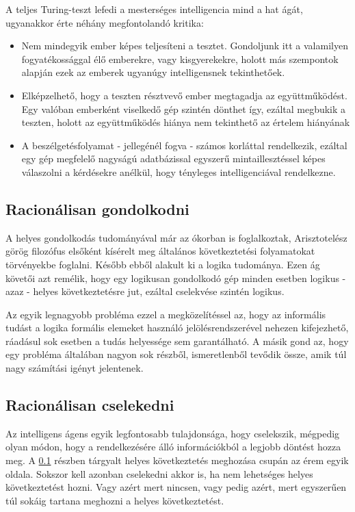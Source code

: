 A teljes Turing-teszt lefedi a mesterséges intelligencia mind a hat ágát, ugyanakkor érte néhány megfontolandó kritika: \cite{bibref:turing}
\begin{itemize}
	\item Nem mindegyik ember képes teljesíteni a tesztet. Gondoljunk itt a valamilyen fogyatékossággal élő emberekre, vagy kisgyerekekre, holott más szempontok alapján ezek az emberek ugyanúgy intelligensnek tekinthetőek.
	\item Elképzelhető, hogy a teszten résztvevő ember megtagadja az együttműködést. Egy valóban emberként viselkedő gép szintén dönthet így, ezáltal megbukik a teszten, holott az együttműködés hiánya nem tekinthető az értelem hiányának
	\item A beszélgetésfolyamat - jellegénél fogva - számos korláttal rendelkezik, ezáltal egy gép megfelelő nagyságú adatbázissal egyszerű mintaillesztéssel képes válaszolni a kérdésekre anélkül, hogy tényleges intelligenciával rendelkezne. 
\end{itemize}

\subsection{Racionálisan gondolkodni} \label{subsection:racional_thinking}
A helyes gondolkodás tudományával már az ókorban is foglalkoztak, Arisztotelész görög filozófus elsőként kísérelt meg általános következtetési folyamatokat törvényekbe foglalni. Később ebből alakult ki a logika tudománya. Ezen ág követői azt remélik, hogy egy logikusan gondolkodó gép minden esetben logikus - azaz - helyes következtetésre jut, ezáltal cselekvése szintén logikus.\ujsor

Az egyik legnagyobb probléma ezzel a megközelítéssel az, hogy az informális tudást a logika formális elemeket használó jelölésrendszerével nehezen kifejezhető, ráadásul sok esetben a tudás helyessége sem garantálható. A másik gond az, hogy egy probléma általában nagyon sok részből, ismeretlenből tevődik össze, amik túl nagy számítási igényt jelentenek.

\subsection{Racionálisan cselekedni}
Az intelligens ágens egyik legfontosabb tulajdonsága, hogy cselekszik, mégpedig olyan módon, hogy a rendelkezésére álló információkból a legjobb döntést hozza meg. A \ref*{subsection:racional_thinking} részben tárgyalt helyes következtetés meghozása csupán az érem egyik oldala. Sokszor kell azonban cselekedni akkor is, ha nem lehetséges helyes következtetést hozni. Vagy azért mert nincsen, vagy pedig azért, mert egyszerűen túl sokáig tartana meghozni a helyes következtetést.

